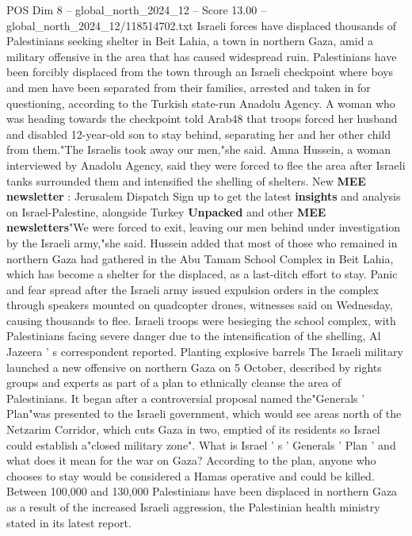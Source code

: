 \begin{textsample}{POS Dim 8 – global\_north\_2024\_12 – Score 13.00 – global\_north\_2024\_12/118514702.txt}  \label{ex:f8_pos_096}
Israeli forces have displaced thousands of Palestinians seeking shelter in Beit Lahia, a town in northern Gaza, amid a military offensive in the area that has caused widespread ruin.
Palestinians have been forcibly displaced from the town through an Israeli checkpoint where boys and men have been separated from their families, arrested and taken in for questioning, according to the Turkish state-run Anadolu Agency.
A woman who was heading towards the checkpoint told Arab48 that troops forced her husband and disabled 12-year-old son to stay behind, separating her and her other child from them."The Israelis took away our men,"she said.
Amna Hussein, a woman interviewed by Anadolu Agency, said they were forced to flee the area after Israeli tanks surrounded them and intensified the shelling of shelters.
New \textbf{MEE} \textbf{newsletter} : Jerusalem Dispatch Sign up to get the latest \textbf{insights} and analysis on Israel-Palestine, alongside Turkey \textbf{Unpacked} and other \textbf{MEE} \textbf{newsletters}"We were forced to exit, leaving our men behind under investigation by the Israeli army,"she said.
Hussein added that most of those who remained in northern Gaza had gathered in the Abu Tamam School Complex in Beit Lahia, which has become a shelter for the displaced, as a last-ditch effort to stay.
Panic and fear spread after the Israeli army issued expulsion orders in the complex through speakers mounted on quadcopter drones, witnesses said on Wednesday, causing thousands to flee.
Israeli troops were besieging the school complex, with Palestinians facing severe danger due to the intensification of the shelling, Al Jazeera ' s correspondent reported.
Planting explosive barrels The Israeli military launched a new offensive on northern Gaza on 5 October, described by rights groups and experts as part of a plan to ethnically cleanse the area of Palestinians.
It began after a controversial proposal named the"Generals ' Plan"was presented to the Israeli government, which would see areas north of the Netzarim Corridor, which cuts Gaza in two, emptied of its residents so Israel could establish a"closed military zone".
What is Israel ' s ' Generals ' Plan ' and what does it mean for the war on Gaza?
According to the plan, anyone who chooses to stay would be considered a Hamas operative and could be killed.
Between 100,000 and 130,000 Palestinians have been displaced in northern Gaza as a result of the increased Israeli aggression, the Palestinian health ministry stated in its latest report.

\end{textsample}

